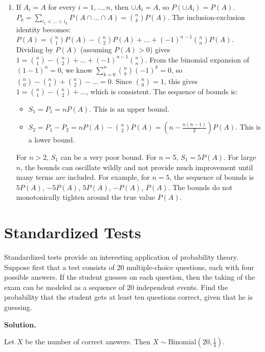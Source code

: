 \begin{enumerate}[label=(\alph*)]
    \item If $A_i=A$ for every $i=1, \dots, n$, then $\cup A_i = A$, so $P(\cup A_i) = P(A)$.
    $P_k = \sum_{i_1 < \dots < i_k} P(A \cap \dots \cap A) = \binom{n}{k} P(A)$.
    The inclusion-exclusion identity becomes: $P(A) = \binom{n}{1}P(A) - \binom{n}{2}P(A) + \dots + (-1)^{n-1}\binom{n}{n}P(A)$.
    Dividing by $P(A)$ (assuming $P(A)>0$) gives $1 = \binom{n}{1} - \binom{n}{2} + \dots + (-1)^{n-1}\binom{n}{n}$.
    From the binomial expansion of $(1-1)^n = 0$, we know $\sum_{k=0}^n \binom{n}{k}(-1)^k = 0$, so $\binom{n}{0} - \binom{n}{1} + \binom{n}{2} - \dots = 0$. Since $\binom{n}{0}=1$, this gives $1 = \binom{n}{1} - \binom{n}{2} + \dots$, which is consistent.
    \vspace{1ex} %
    The sequence of bounds is:
    \begin{itemize}
        \item $S_1 = P_1 = nP(A)$. This is an upper bound.
        \item $S_2 = P_1 - P_2 = nP(A) - \binom{n}{2}P(A) = (n - \frac{n(n-1)}{2})P(A)$. This is a lower bound.
    \end{itemize}
    For $n > 2$, $S_1$ can be a very poor bound. For $n=5$, $S_1=5P(A)$. For large $n$, the bounds can oscillate wildly and not provide much improvement until many terms are included. For example, for $n=5$, the sequence of bounds is $5P(A)$, $-5P(A)$, $5P(A)$, $-P(A)$, $P(A)$. The bounds do not monotonically tighten around the true value $P(A)$.
\end{enumerate}

\section{Standardized Tests}

\begin{problembox}
Standardized tests provide an interesting application of probability theory. Suppose first that a test consists of 20 multiple-choice questions, each with four possible answers. If the student guesses on each question, then the taking of the exam can be modeled as a sequence of 20 independent events. Find the probability that the student gets at least ten questions correct, given that he is guessing.
\end{problembox}

\noindent\textbf{Solution.}

Let $X$ be the number of correct answers. Then $X \sim \text{Binomial}(20, \frac{1}{4})$.

